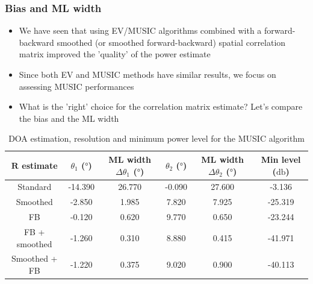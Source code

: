 \documentclass[UKenglish,8pt,aspectratio=1610]{beamer}
\begin{document}
\begin{frame}
	\frametitle{Bias and ML width}
\begin{itemize}
	\item We have seen that using EV/MUSIC algorithms combined with a forward-backward smoothed (or smoothed forward-backward) spatial correlation matrix improved the 'quality' of the power estimate
	\item Since both EV and MUSIC methods have similar results, we focus on assessing MUSIC performances
	\item What is the 'right' choice for the correlation matrix estimate? Let's compare the bias and the ML width
\end{itemize}
\begin{table}
	\begin{tabular}{cccccc}
		\hline
		$\mathbf{R}$ estimate& $\theta_1$ ($\si{\degree}$)&ML width $\Delta\theta_1$ ($\si{\degree}$)&$\theta_2$ ($\si{\degree}$)&ML width $\Delta\theta_2$ ($\si{\degree}$)&Min level ($\si{\decibel}$)\\
		\hline
			\hline
Standard&-14.390&26.770&-0.090&27.600&-3.136\\
Smoothed&-2.850&1.985&7.820&7.925&-25.319\\
FB&-0.120&0.620&9.770&0.650&-23.244\\
FB + smoothed&-1.260&0.310&8.880&0.415&-41.971\\
Smoothed + FB&-1.220&0.375&9.020&0.900&-40.113\\
		\hline
	\end{tabular}
\centering
\caption{DOA estimation, resolution and minimum power level for the MUSIC algorithm}
\end{table}


\end{frame}
\end{document}

